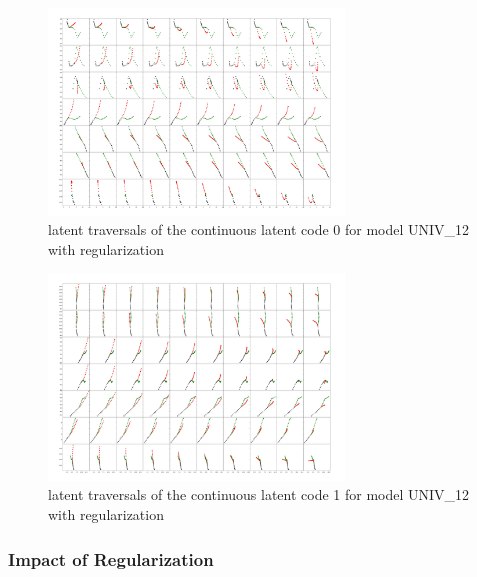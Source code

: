 \begin{figure}[t]
  \centering
  \includegraphics[width=0.7\textwidth]{figures/cont_interpolations_code0_batch2.jpeg}
  \caption{latent traversals of the continuous latent code 0 for model UNIV\_12 with regularization}
  \label{cont_code_0}
\end{figure}
\begin{figure}[t]
  \centering
  \includegraphics[width=0.7\textwidth]{figures/reg_cont_interpolations_code1_batch1.jpeg}
  \caption{latent traversals of the continuous latent code 1 for model UNIV\_12 with regularization}
  \label{cont_code_1}
\end{figure}

\subsubsection{Impact of Regularization}
\hfill \\

